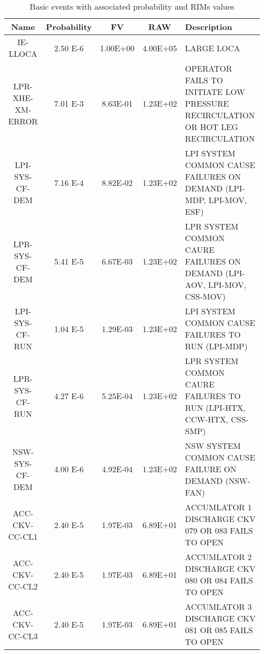 \begin{table}
  \centering
  \begin{tabular}{c | c | c | c | p{5cm}} 
    \hline 
     Name           & Probability  & FV        &  RAW     & Description \\ 
    \hline 
     IE-LLOCA         & 2.50 E-6     &  1.00E+00 & 4.00E+05  & LARGE LOCA \\
     LPR-XHE-XM-ERROR & 7.01 E-3     &  8.63E-01 & 1.23E+02  & OPERATOR FAILS TO INITIATE LOW PRESSURE RECIRCULATION OR HOT LEG RECIRCULATION \\
     LPI-SYS-CF-DEM   & 7.16 E-4     &  8.82E-02 & 1.23E+02  & LPI SYSTEM COMMON CAUSE FAILURES ON DEMAND (LPI-MDP, LPI-MOV, ESF) \\
     LPR-SYS-CF-DEM   & 5.41 E-5     &  6.67E-03 & 1.23E+02  & LPR SYSTEM COMMON CAURE FAILURES ON DEMAND (LPI-AOV, LPI-MOV, CSS-MOV) \\
     LPI-SYS-CF-RUN   & 1.04 E-5     &  1.29E-03 & 1.23E+02  & LPI SYSTEM COMMON CAUSE FAILURES TO RUN (LPI-MDP) \\
     LPR-SYS-CF-RUN   & 4.27 E-6     &  5.25E-04 & 1.23E+02  & LPR SYSTEM COMMON CAURE FAILURES TO RUN (LPI-HTX, CCW-HTX, CSS-SMP) \\
     NSW-SYS-CF-DEM   & 4.00 E-6     &  4.92E-04 & 1.23E+02  & NSW SYSTEM COMMON CAUSE FAILURE ON DEMAND (NSW-FAN) \\
     ACC-CKV-CC-CL1   & 2.40 E-5     &  1.97E-03 & 6.89E+01  & ACCUMLATOR 1 DISCHARGE CKV 079 OR 083 FAILS TO OPEN \\
     ACC-CKV-CC-CL2   & 2.40 E-5     &  1.97E-03 & 6.89E+01  & ACCUMLATOR 2 DISCHARGE CKV 080 OR 084 FAILS TO OPEN \\
     ACC-CKV-CC-CL3   & 2.40 E-5     &  1.97E-03 & 6.89E+01  & ACCUMLATOR 3 DISCHARGE CKV 081 OR 085 FAILS TO OPEN \\
    \hline 
  \end{tabular}
  \caption{Basic events with associated probability and RIMs values}
  \label{tab:BE}
\end{table}
\addtocounter{table}{-1}
